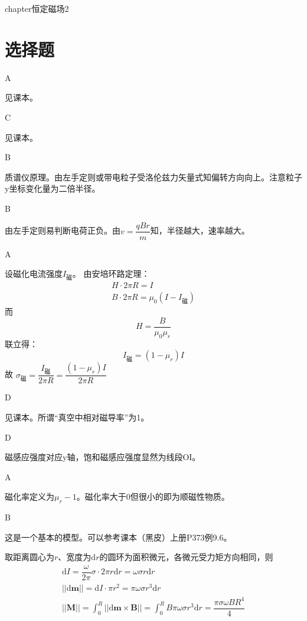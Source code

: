 \documentclass[b5paper,opensource]{./template/qyxf-book}
\newcommand{\di}[1]{\mathrm{d}#1}
\begin{document}
chapter{恒定磁场2}%
\section{选择题}

A

\solve 
见课本。

C

\solve 
见课本。

B

\solve
质谱仪原理。由左手定则或带电粒子受洛伦兹力矢量式知偏转方向向上。注意粒子y坐标变化量为二倍半径。

B

\solve
由左手定则易判断电荷正负。由$v=\dfrac{qBr}{m}$知，半径越大，速率越大。

A

\solve
设磁化电流强度$I_\text{磁}$。
由安培环路定理：
\begin{gather*}
	H\cdot 2\pi R=I\\
	B\cdot 2\pi R=\mu_0(I-I_\text{磁})
\end{gather*}
而
\[
H=\dfrac{B}{\mu_0\mu_r}
\]
联立得：
\[
I_\text{磁}=(1-\mu_r)I
\]
故
$\sigma_\text{磁}=\dfrac{I_\text{磁}}{2\pi R}=\dfrac{(1-\mu_r)I}{2\pi R}$
\footnotemark[1]

D

\solve
见课本。所谓“真空中相对磁导率”为1。

D

\solve
磁感应强度对应y轴，饱和磁感应强度显然为线段OI。

A

\solve
磁化率定义为$\mu_r-1$。磁化率大于0但很小的即为顺磁性物质。

B

\solve
这是一个基本的模型。可以参考课本（黑皮）上册\rm{P}373例9.6。

取距离圆心为$r$、宽度为$\di{r}$的圆环为面积微元，各微元受力矩方向相同，则
\begin{gather*}
	\di{I}=\dfrac{\omega}{2\pi}\sigma\cdot 2\pi r\di{r}=\omega\sigma r\di{r}\\
	||\di{\textbf{m}}||=\di{I}\cdot \pi r^2=\pi\omega\sigma r^3\di{r}\\
	||\textbf{M}||=\int_{0}^{R}||\di{\textbf{m}}\times \textbf{B}||=\int_{0}^{R}B\pi\omega\sigma r^3\di{r}=\dfrac{\pi\sigma\omega BR^4}{4}
\end{gather*}
\end{document}
